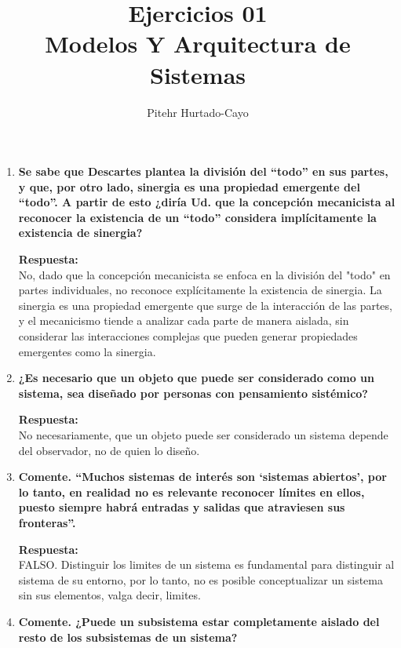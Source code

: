 \documentclass[12pt,a4paper]{article}
\title{Ejercicios 01\\
\large Modelos Y Arquitectura de Sistemas}
\author{Pitehr Hurtado-Cayo}
\begin{document}
\maketitle

\begin{enumerate}[label=\textbf{Pregunta \arabic*.}]
    \item \textbf{Se sabe que Descartes plantea la división del “todo”
              en sus partes, y que, por otro lado, sinergia es una
              propiedad emergente del “todo”. A partir de esto ¿diría Ud.
              que la concepción mecanicista al reconocer la existencia
              de un “todo” considera implícitamente la existencia de
              sinergia?}

          \textbf{Respuesta:} \\
          No, dado que la concepción mecanicista se enfoca en la división del "todo" en partes individuales,
          no reconoce explícitamente la existencia de sinergia. La sinergia es una propiedad emergente que
          surge de la interacción de las partes, y el mecanicismo tiende a analizar cada parte de manera aislada,
          sin considerar las interacciones complejas que pueden generar propiedades emergentes como la sinergia.

    \item \textbf{¿Es necesario que un objeto que puede ser
              considerado como un sistema, sea diseñado por personas
              con pensamiento sistémico?}

          \textbf{Respuesta:} \\
          No necesariamente, que un objeto puede ser considerado un sistema depende del observador, no de quien lo diseño.

    \item \textbf{Comente. “Muchos sistemas de interés son ‘sistemas abiertos’, por
              lo tanto, en realidad no es relevante reconocer límites en
              ellos, puesto siempre habrá entradas y salidas que
              atraviesen sus fronteras”.}

          \textbf{Respuesta:} \\
          FALSO. Distinguir los limites de un sistema es fundamental para distinguir al sistema de su entorno, por lo tanto, no es posible conceptualizar un sistema sin sus elementos, valga decir, limites.
    \item \textbf{Comente. ¿Puede un subsistema estar completamente aislado
              del resto de los subsistemas de un sistema?}


\end{enumerate}
\end{document}
